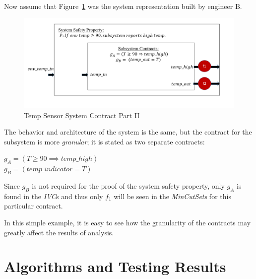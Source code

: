 Now assume that Figure~\ref{fig:granularityEx2} was the system representation built by engineer B. 

\begin{figure}[h]
\begin{center}
\includegraphics[width=14cm]{images/granularityEx2.PNG}
\caption{Temp Sensor System Contract Part II} \label{fig:granularityEx2}
\end{center}
\end{figure} 

The behavior and architecture of the system is the same, but the contract for the subsystem is more \textit{granular}; it is stated as two separate contracts:
\begin{center}
    $ g_A = (T \geq 90 \implies temp\_high)$ \\ 
    $ g_B = (temp\_indicator = T)$ 
\end{center}

Since $g_B$ is not required for the proof of the system safety property, only $g_A$ is found in the \textit{IVC}s and thus only $f_1$ will be seen in the \textit{MinCutSets} for this particular contract. 

In this simple example, it is easy to see how the granularity of the contracts may greatly affect the results of analysis.

\section{Algorithms and Testing Results}
